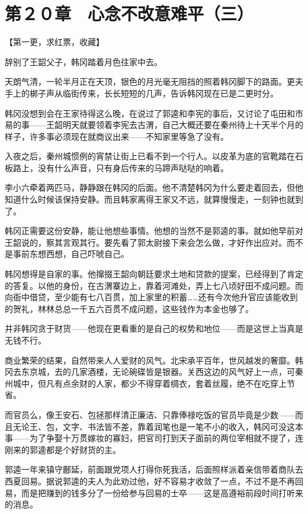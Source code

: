 \section{第２０章　心念不改意难平（三）}

【第一更，求红票，收藏】

辞别了王韶父子，韩冈踏着月色往家中去。

天朗气清，一轮半月正在天顶，银色的月光毫无阻挡的照着韩冈脚下的路面。更夫手上的梆子声从临街传来，长长短短的几声，告诉韩冈现在已是二更时分。

韩冈没想到会在王家待得这么晚，在说过了郭逵和李宪的事后，又讨论了屯田和市易的事——王韶明天就要领着李宪去古渭，自己大概还要在秦州待上十天半个月的样子，许多事必须现在就商议出来——不知家里等急了没有。

入夜之后，秦州城惯例的宵禁让街上已看不到一个行人。以皮革为底的官靴踏在石板路上，没有什么声音，只有身后传来的马蹄声哒哒的响着。

李小六牵着两匹马，静静跟在韩冈的后面。他不清楚韩冈为什么要走着回去，但他知道什么时候该保持安静。而且韩家离得王家又不远，就算慢慢走，一刻钟也就到了。

韩冈正需要这份安静，能让他想些事情。他想的当然不是郭逵的事。就如他早前对王韶说的，察其言观其行。要先看了郭太尉接下来会怎么做，才好作出应对。而不是事前东想西想，自己吓唬自己。

韩冈想得是自家的事。他撺掇王韶向朝廷要求土地和贷款的提案，已经得到了肯定的答复。以他的身份，在古渭寨边上，靠着河滩处，弄上七八顷好田不成问题。而向衙中借贷，至少能有七八百贯，加上家里的积蓄……还有今次他升官应该能收到的贺礼，林林总总一千五六百贯不成问题，这些钱作为本金也够了。

并非韩冈贪于财货——他现在更看重的是自己的权势和地位——而是这世上当真是无钱不行。

商业繁荣的结果，自然带来人人爱财的风气。北宋承平百年，世风越发的奢靡。韩冈去东京城，去的几家酒楼，无论碗碟皆是银器。关西这边的风气好上一点，可秦州城中，但凡有点余财的人家，都少不得穿着绸衣，套着丝履，绝不在吃穿上节省。

而官员么，像王安石、包拯那样清正廉洁、只靠俸禄吃饭的官员毕竟是少数——而且无论王、包，文字、书法皆不差，靠着润笔也是一笔不小的收入，韩冈可没这本事——为了争娶十万贯嫁妆的寡妇，把官司打到天子面前的两位宰相就不提了，连刚来的郭逵都是个好财货的主。

郭逵一年来镇守鄜延，前面跟党项人打得你死我活，后面照样派着亲信带着商队去西夏回易。据说郭逵的夫人为此劝过他，好不容易才收敛了一点，不过不是不再回易，而是把赚到的钱多分了一份给参与回易的士卒——这是高遵裕前段时间打听来的消息。

